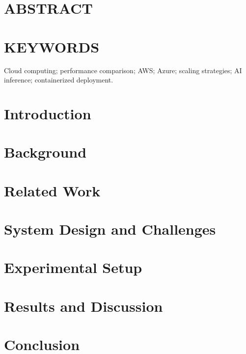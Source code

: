 \documentclass[twocolumn]{article}
\begin{document}
\makeatother

\date{}  %

\maketitle

{
\section*{ABSTRACT}\label{sec:abstract}
\small

}

{
\section*{KEYWORDS}\label{sec:keyWords}
\small
Cloud computing; performance comparison; AWS; Azure; scaling strategies; AI inference; containerized deployment.
}

\section{Introduction}


\section{Background}


\section{Related Work}


\section{System Design and Challenges}


\section{Experimental Setup}


\section{Results and Discussion}


\section{Conclusion}




\end{document}
